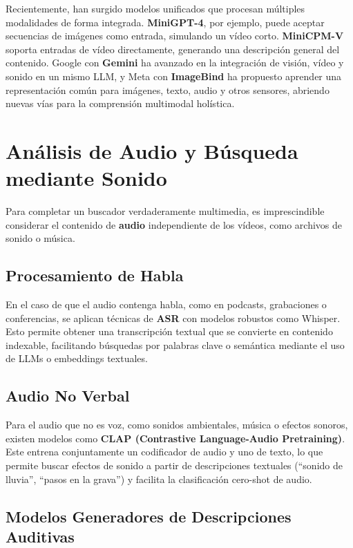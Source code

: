 Recientemente, han surgido modelos unificados que procesan múltiples modalidades de forma integrada. \textbf{MiniGPT-4}, por ejemplo, puede aceptar secuencias de imágenes como entrada, simulando un vídeo corto. \textbf{MiniCPM-V} soporta entradas de vídeo directamente, generando una descripción general del contenido. Google con \textbf{Gemini} ha avanzado en la integración de visión, vídeo y sonido en un mismo LLM, y Meta con \textbf{ImageBind} ha propuesto aprender una representación común para imágenes, texto, audio y otros sensores, abriendo nuevas vías para la comprensión multimodal holística.

\section{Análisis de Audio y Búsqueda mediante Sonido}

Para completar un buscador verdaderamente multimedia, es imprescindible considerar el contenido de \textbf{audio} independiente de los vídeos, como archivos de sonido o música.

\subsection{Procesamiento de Habla}

En el caso de que el audio contenga habla, como en podcasts, grabaciones o conferencias, se aplican técnicas de \textbf{ASR} con modelos robustos como Whisper. Esto permite obtener una transcripción textual que se convierte en contenido indexable, facilitando búsquedas por palabras clave o semántica mediante el uso de LLMs o embeddings textuales.

\subsection{Audio No Verbal}

Para el audio que no es voz, como sonidos ambientales, música o efectos sonoros, existen modelos como \textbf{CLAP (Contrastive Language-Audio Pretraining)}. Este entrena conjuntamente un codificador de audio y uno de texto, lo que permite buscar efectos de sonido a partir de descripciones textuales (``sonido de lluvia'', ``pasos en la grava'') y facilita la clasificación cero-shot de audio.

\subsection{Modelos Generadores de Descripciones Auditivas}

